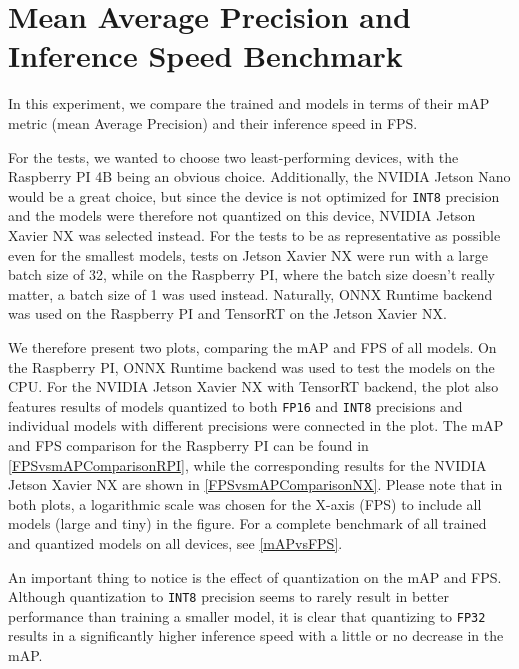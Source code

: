 \section{Mean Average Precision and Inference Speed Benchmark}
\label{FPSvsmAPComparison}

In this experiment, we compare the trained and models in terms of their mAP
metric (mean Average Precision) and their inference speed in FPS.

For the tests, we wanted to choose two least-performing devices, with the
Raspberry PI 4B being an obvious choice. Additionally, the NVIDIA Jetson Nano
would be a great choice, but since the device is not optimized for \texttt{INT8}
precision and the models were therefore not quantized on this device, NVIDIA
Jetson Xavier NX was selected instead. For the tests to be as representative as
possible even for the smallest models, tests on Jetson Xavier NX were run with a
large batch size of 32, while on the Raspberry PI, where the batch size doesn't
really matter, a batch size of 1 was used instead. Naturally, ONNX Runtime
backend was used on the Raspberry PI and TensorRT on the Jetson Xavier NX.

We therefore present two plots, comparing the mAP and FPS of all models. On the
Raspberry PI, ONNX Runtime backend was used to test the models on the CPU. For
the NVIDIA Jetson Xavier NX with TensorRT backend, the plot also features
results of models quantized to both \texttt{FP16} and \texttt{INT8} precisions
and individual models with different precisions were connected in the plot. The
mAP and FPS comparison for the Raspberry PI can be found in
\autoref{FPSvsmAPComparisonRPI}, while the corresponding results for the NVIDIA
Jetson Xavier NX are shown in \autoref{FPSvsmAPComparisonNX}. Please note that
in both plots, a logarithmic scale was chosen for the X-axis (FPS) to include
all models (large and tiny) in the figure. For a complete benchmark of all
trained and quantized models on all devices, see \autoref{mAPvsFPS}.

An important thing to notice is the effect of quantization on the mAP and FPS.
Although quantization to \texttt{INT8} precision seems to rarely result in
better performance than training a smaller model, it is clear that quantizing to
\texttt{FP32} results in a significantly higher inference speed with a little or
no decrease in the mAP.

